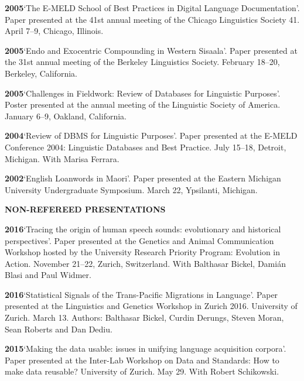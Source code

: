\documentclass[11pt]{article}
\newcommand{\hangpara}{
 \setlength{\parindent}{0in} %
 \hangindent=0.42in %
}
\begin{document}
\vskip 6pt
\hangpara
{\bf 2005}\hspace{1ex}`The E-MELD School of Best Practices in Digital Language Documentation'. Paper presented at the 41st annual meeting of the Chicago Linguistics Society 41. April 7--9, Chicago, Illinois.

\vskip 6pt
\hangpara
{\bf 2005}\hspace{1ex}`Endo and Exocentric Compounding in Western Sisaala'. Paper presented at the 31st annual meeting of the Berkeley Linguistics Society. February 18--20, Berkeley, California.

\vskip 6pt
\hangpara
{\bf 2005}\hspace{1ex}`Challenges in Fieldwork: Review of Databases for Linguistic Purposes'. Poster presented at the annual meeting of the Linguistic Society of America. January 6--9, Oakland, California.

\vskip 6pt
\hangpara
{\bf 2004}\hspace{1ex}`Review of DBMS for Linguistic Purposes'. Paper presented at the E-MELD Conference 2004: Linguistic Databases and Best Practice. July 15--18, Detroit, Michigan. With Marisa Ferrara.

\vskip 6pt
\hangpara
{\bf 2002}\hspace{1ex}`English Loanwords in Maori'. Paper presented at the Eastern Michigan University Undergraduate Symposium. March 22, Ypsilanti, Michigan.


\vskip 20pt
\begin{flushleft}
{\bf NON-REFEREED PRESENTATIONS}
\end{flushleft}

\hangpara
{\bf 2016}\hspace{1ex}`Tracing the origin of human speech sounds: evolutionary and historical perspectives'. Paper presented at the Genetics and Animal Communication Workshop hosted by the University Research Priority Program: Evolution in Action. November 21--22, Zurich, Switzerland. With Balthasar Bickel, Dami{\'a}n Blasi and Paul Widmer.

\hangpara
\vskip 6pt
{\bf 2016}\hspace{1ex}`Statistical Signals of the Trans-Pacific Migrations in Language'. Paper presented at the Linguistics and Genetics Workshop in Zurich 2016. University of Zurich. March 13. Authors: Balthasar Bickel, Curdin Derungs, Steven Moran, Sean Roberts and Dan Dediu.

\hangpara
\vskip 6pt
{\bf 2015}\hspace{1ex}`Making the data usable: issues in unifying language acquisition corpora'. Paper presented at the Inter-Lab Workshop on Data and Standards: How to make data reusable? University of Zurich. May 29. With Robert Schikowski.
\end{document}
